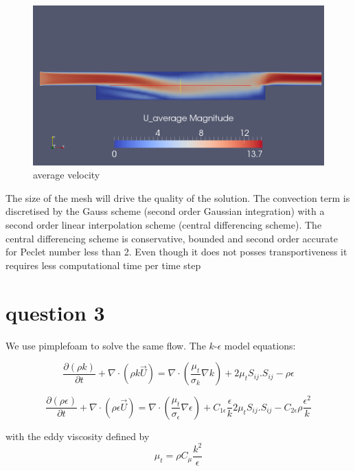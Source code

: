 \documentclass[10pt,a4paper]{report}
\begin{document}
\begin{figure}[H]
  \caption{average velocity}
  \centering
    \includegraphics[width=1\textwidth]{average_U_pisoFoam.png}
\end{figure}

The size of the mesh will drive the quality of the solution.
The convection term is discretised by
the Gauss scheme (second order Gaussian integration) with a second order linear interpolation scheme (central differencing scheme). The central differencing scheme is conservative, bounded and second order accurate for Peclet number less than 2. Even though it does not posses transportiveness it requires less computational time per time step
\section{question 3}
We use pimplefoam to solve the same flow. The $k$-$\epsilon$ model equations:

\begin{equation}\label{k}
\frac{\partial(\rho k)}{\partial t}+ \nabla\cdot (\rho k\vec{U}) = \nabla\cdot(\frac{\mu_{t}}{\sigma_{k}}\nabla k) + 2\mu_{t}S_{ij}.S_{ij}-\rho\epsilon
\end{equation}

\begin{equation}\label{e}
\frac{\partial(\rho \epsilon)}{\partial t}+ \nabla\cdot (\rho \epsilon\vec{U}) = \nabla\cdot(\frac{\mu_{t}}{\sigma_{\epsilon}}\nabla \epsilon) + C_{1\epsilon}\frac{\epsilon}{k}2\mu_{t}S_{ij}.S_{ij}-C_{2\epsilon}\rho\frac{\epsilon^{2}}{k}
\end{equation}

with the eddy viscosity defined by
\begin{equation}
\mu_{t} = \rho C_{\mu}\frac{k^{2}}{\epsilon}
\end{equation}
\end{document}
